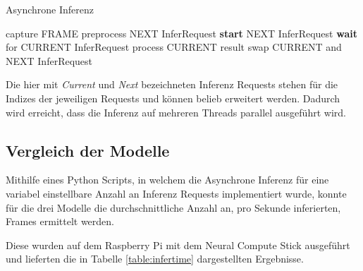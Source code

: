 \vspace{1cm}
\begin{minipage}{0.1\textwidth}
  \hfill
\end{minipage}
\begin{minipage}{0.5\textwidth}
  \begin{algorithm}[H]
    \caption{Asynchrone Inferenz}
    \label{code:async}
    \begin{algorithmic}
    \WHILE{\TRUE}
        \STATE capture FRAME
        \STATE preprocess NEXT InferRequest
        \STATE \textbf{start} NEXT InferRequest
          \STATE \textbf{wait} for CURRENT InferRequest
          \STATE process CURRENT result
          \STATE swap CURRENT and NEXT InferRequest
    \ENDWHILE
    \end{algorithmic}
  \end{algorithm}
\end{minipage}
\begin{minipage}{0.4\textwidth}
  \centering
  \vspace{1cm}
  \def\svgwidth{0.5\textwidth}
  
\end{minipage}

\vspace{1cm}

\begin{figure}[H]
  \centering
  \def\svgwidth{0.9\textwidth}
  
  \caption{}
  \label{fig:async}
\end{figure}

Die hier mit \textit{Current} und \textit{Next} bezeichneten 
Inferenz Requests stehen für die Indizes der jeweiligen Requests
und können belieb erweitert werden. 
Dadurch wird erreicht, dass die Inferenz auf mehreren Threads 
parallel ausgeführt wird.


\subsection{Vergleich der Modelle}

Mithilfe eines Python Scripts, in welchem die Asynchrone Inferenz 
für eine variabel einstellbare Anzahl an Inferenz Requests
implementiert wurde, konnte für die drei Modelle die 
durchschnittliche Anzahl an, pro Sekunde inferierten, Frames 
ermittelt werden.

Diese wurden auf dem Raspberry Pi mit dem Neural Compute Stick 
ausgeführt und lieferten die in Tabelle \ref{table:infertime}
dargestellten Ergebnisse.

